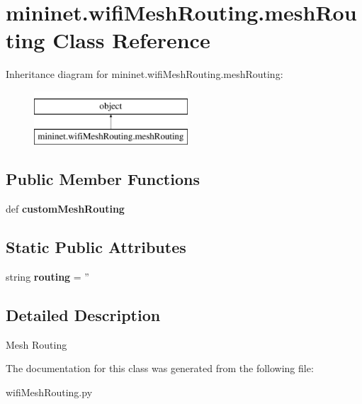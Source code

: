 \hypertarget{classmininet_1_1wifiMeshRouting_1_1meshRouting}{\section{mininet.\-wifi\-Mesh\-Routing.\-mesh\-Routing Class Reference}
\label{classmininet_1_1wifiMeshRouting_1_1meshRouting}
}
Inheritance diagram for mininet.\-wifi\-Mesh\-Routing.\-mesh\-Routing\-:\begin{figure}[H]
\begin{center}
\leavevmode
\includegraphics[height=2.000000cm]{classmininet_1_1wifiMeshRouting_1_1meshRouting}
\end{center}
\end{figure}
\subsection*{Public Member Functions}
\begin{DoxyCompactItemize}
\item 
\hypertarget{classmininet_1_1wifiMeshRouting_1_1meshRouting_ab2ff66eaf74f314c9a3c87283a5b6f95}{def {\bfseries custom\-Mesh\-Routing}}\label{classmininet_1_1wifiMeshRouting_1_1meshRouting_ab2ff66eaf74f314c9a3c87283a5b6f95}

\end{DoxyCompactItemize}
\subsection*{Static Public Attributes}
\begin{DoxyCompactItemize}
\item 
\hypertarget{classmininet_1_1wifiMeshRouting_1_1meshRouting_a30cba73b36a7080c264c587a6fe62e06}{string {\bfseries routing} = ''}\label{classmininet_1_1wifiMeshRouting_1_1meshRouting_a30cba73b36a7080c264c587a6fe62e06}

\end{DoxyCompactItemize}


\subsection{Detailed Description}
\begin{DoxyVerb}Mesh Routing\end{DoxyVerb}
 

The documentation for this class was generated from the following file\-:\begin{DoxyCompactItemize}
\item 
wifi\-Mesh\-Routing.\-py\end{DoxyCompactItemize}
